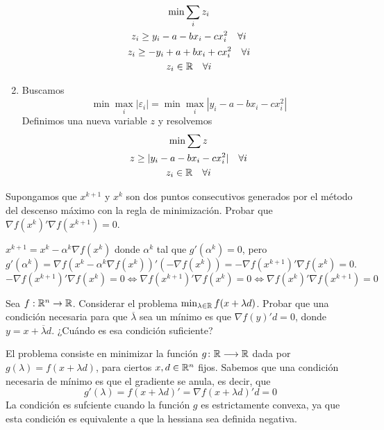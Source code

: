 \documentclass[twoside]{article}
\begin{document}
\begin{ejercicio}{1}
\begin{solucion}
\begin{enumerate}
\begin{gather*}
\min \sum_i z_i\\
z_i\geq y_i -a-bx_i-c x_i^2 \quad \forall i \\
z_i\geq -y_i +a+bx_i+c x_i^2 \quad \forall i\\
z_i \in \mathbb{R} \quad \forall i
\end{gather*}
\item Buscamos
$$
\min \max_i |\varepsilon_i| = \min \max_i |y_i -a-bx_i-c x_i^2|
$$
Definimos una nueva variable $z$ y resolvemos
\begin{gather*}
\min \sum z\\
z\geq |y_i -a-bx_i-c x_i^2| \quad \forall i\\
z_i \in \mathbb{R} \quad \forall i
\end{gather*}
\end{enumerate}
\end{solucion}
\end{ejercicio}

\newpage 

\begin{ejercicio}{2}
Supongamos que $x^{k+1}$ y $x^k$ son dos puntos consecutivos generados por el método del descenso máximo con la regla de minimización. Probar que $\nabla f(x^{k})'\nabla f(x^{k+1})=0$.
\end{ejercicio}
\begin{solucion}
$x^{k+1}=x^k-\alpha^k\nabla f(x^k)$ donde $\alpha^k$ tal que $g'(\alpha^k)=0$, pero $$g'(\alpha^k)=\nabla f(x^k-\alpha^k\nabla f(x^k))'(-\nabla f(x^k))=-\nabla f(x^{k+1})'\nabla f(x^{k})=0.$$
$$ -\nabla f(x^{k+1})'\nabla f(x^{k})=0 \Leftrightarrow \nabla f(x^{k+1})'\nabla f(x^{k})=0 \Leftrightarrow \nabla f(x^{k})'\nabla f(x^{k+1})=0
$$
\end{solucion}

\newpage

\begin{ejercicio}{3}
Sea $f:\mathbb{R}^n\to\mathbb{R}$. Considerar el problema $\min_{\lambda\in\mathbb{R}}f(x+\lambda d)$. Probar que una condición necesaria para que $\overline{\lambda}$ sea un mínimo es que $\nabla f(y)'d=0$, donde $y=x+\overline{\lambda}d$. ¿Cuándo es esa condición suficiente?
\begin{solucion}
El problema consiste en minimizar la función $g\colon{\mathbb{R}}\longrightarrow{\mathbb{R}}$ dada por $g(\lambda) = f(x+\lambda d)$, para ciertos $x,d\in\mathbb{R}^n$ fijos. Sabemos que una condición necesaria de mínimo es que el gradiente se anula, es decir, que
$$
g'(\lambda) = f(x+\lambda d)' = \nabla f(x+\lambda d)'d = 0
$$
La condición es sufciente cuando la función $g$ es estrictamente convexa, ya que esta condición es equivalente a que la hessiana sea definida negativa.
\end{solucion}
\end{ejercicio}
\end{document}
